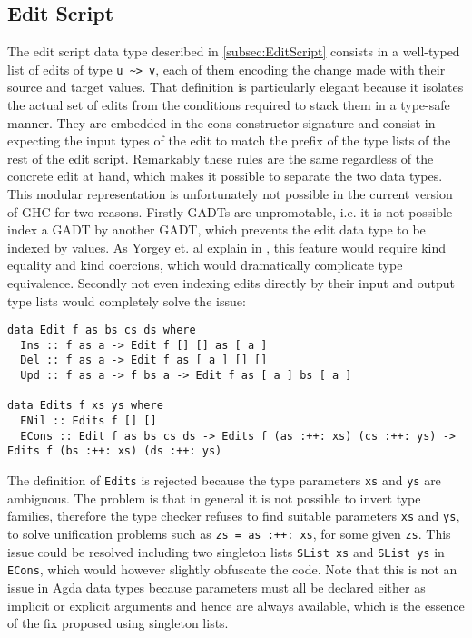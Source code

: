 \documentclass[../Thesis.tex]{subfiles}
\begin{document}
	\subsection{Edit Script}
	The edit script data type described in \ref{subsec:EditScript} consists in
	a well-typed list of edits of type \texttt{u \textasciitilde> v}, each of them
	encoding the change made with their source and target values.
	That definition is particularly elegant because it isolates the actual set of
	edits from the conditions required to stack them in a type-safe manner.
	They are embedded in the cons constructor signature and consist
	in expecting the input types of the edit to match the prefix of the
	type lists of the rest of the edit script.
	Remarkably these rules are the same regardless of the concrete edit 
	at hand, which makes it possible to separate the two data types.
	This modular representation is unfortunately not possible in the current
	version of GHC for two reasons. Firstly GADTs are unpromotable,  i.e. it is 
	not possible index a GADT by another GADT, which prevents the edit data 
	type	to be indexed by values.
	As Yorgey et. al explain in \cite{Yorgey12}, this feature would require kind 
	equality and kind coercions, which would  dramatically complicate type 
	equivalence.
	Secondly not even indexing edits directly by their input and output type lists
	would completely solve the issue:
	
\begin{verbatim}
data Edit f as bs cs ds where
  Ins :: f as a -> Edit f [] [] as [ a ] 
  Del :: f as a -> Edit f as [ a ] [] [] 
  Upd :: f as a -> f bs a -> Edit f as [ a ] bs [ a ] 

data Edits f xs ys where
  ENil :: Edits f [] [] 
  ECons :: Edit f as bs cs ds -> Edits f (as :++: xs) (cs :++: ys) -> Edits f (bs :++: xs) (ds :++: ys) 
\end{verbatim}
	
	The definition of \texttt{Edits} is rejected because the type parameters
	\texttt{xs} and \texttt{ys} are ambiguous. The problem is that 
	in general it is not possible to invert type families, therefore
	the type checker refuses to find suitable parameters \texttt{xs} and 
	\texttt{ys}, to solve unification problems such as \texttt{zs = as :++: xs},
	for some given \texttt{zs}. This issue could be resolved including
	two singleton lists \texttt{SList xs} and \texttt{SList ys} in \texttt{ECons},
	which would however slightly obfuscate the code.
	Note that this is not an issue in Agda data types because parameters
	must all be declared either as implicit or explicit arguments and 
	hence are always available, which is the essence of the fix proposed
	using singleton lists.	
	
\end{document}
